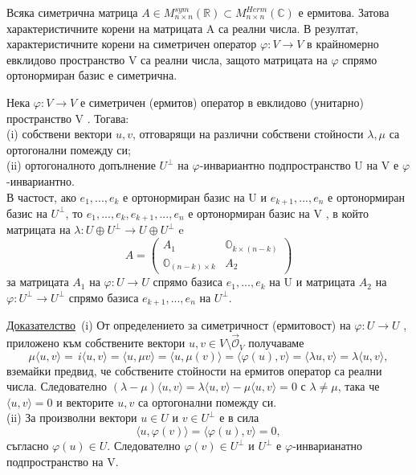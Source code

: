 \documentclass{article}
\newcommand*{\nullvec}{\vec{\mathcal{O}}}
\newcommand*{\bC}{\mathbb{C}}
\newcommand*{\ska}[2]{\langle #1, #2 \rangle}
\newcommand{\dok}{\underline{Доказателство}\  }
\newcommand{\tvurdenie}[2]{
    \begin{tcolorbox}[title = #1 ,colframe = blue!70!black, colback = blue!10!white]
        #2
    \end{tcolorbox}
}
\begin{document}
Всяка симетрична матрица $A\in M^{sym}_{n\times n}(\mathbb{R}) \subset M^{Herm}_{n\times n}(\bC)$
е ермитова. Затова характеристичните корени на матрицата A са реални числа.
В резултат, характеристичните корени на симетричен оператор $\varphi : V \rightarrow V$
в крайномерно евклидово пространство V са реални числа, защото матрицата
на $\varphi$ спрямо ортонормиран базис е симетрична.

\tvurdenie{Твърдение 22.6}{
Нека $\varphi : V \rightarrow V$ е симетричен (ермитов) оператор
в евклидово (унитарно) пространство V . Тогава:\\
(i) собствени вектори $u,v$, отговарящи на различни собствени стойности $\lambda, \mu$
са ортогонални помежду си;\\
(ii) ортогоналното допълнение $U^\perp$ на $\varphi$-инвариантно подпространство
U на V е $\varphi$-инвариантно. \\
В частост, ако $e_1, . . . , e_k$ е ортонормиран базис на U
и $e_{k+1},..., e_n$ е ортонормиран базис на $U^\perp$, то $e_1,..., e_k,e_{k+1},...,e_n$
е ортонормиран базис на V , в който матрицата на $\lambda : U \oplus U^\perp \rightarrow U \oplus U^\perp$ e
\[
    A =\left(\begin{array}{cc}
            A_1                        & \mathbb{O}_{k\times(n-k)} \\
            \mathbb{O}_{(n-k)\times k} & A_2
        \end{array}
    \right)
\]
за матрицата $A_1$ на $\varphi : U \rightarrow U$ спрямо базиса $e_1,..., e_k$ на U и
матрицата $A_2$ на $\varphi : U^\perp \rightarrow U^\perp$ спрямо базиса $e_{k+1}, . . . , e_n$
на $U^\perp$.
}

\dok(i) От определението за симетричност (ермитовост) на
$\varphi : U \rightarrow U$ , приложено към собствените вектори $u, v \in V \setminus {\nullvec_V}$
получаваме
\[
    \mu\ska{u}{v} = \,i\ska{u}{v} = \ska{u}{\mu v} = \ska{u}{\mu(v)} = \ska{\varphi(u)}{v} =
    \ska{\lambda u}{v} = \lambda\ska{u}{v},
\]
вземайки предвид, че собствените стойности на ермитов оператор са реални
числа. Следователно $(\lambda-\mu)\ska{u}{v} = \lambda \ska{u}{v} - \mu\ska{u}{v}= 0$
с $\lambda \neq \mu$, така че $\ska{u}{v} = 0$ и векторите $u, v$ са ортогонални помежду си.\\
(ii) За произволни вектори $u \in U$ и $v \in U^\perp$ е в сила
\[\ska{u}{\varphi(v)} = \ska{\varphi(u)}{v} = 0,\]
съгласно $\varphi(u) \in U$. Следователно $\varphi(v) \in U^\perp$
и $U^\perp$ е $\varphi$-инварианатно подпространство на V.
\end{document}
